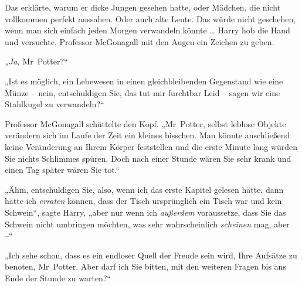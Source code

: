 Das erklärte, warum er dicke Jungen gesehen hatte, oder Mädchen, die nicht vollkommen perfekt aussahen. Oder auch alte Leute. Das würde nicht geschehen, wenn man sich einfach jeden Morgen verwandeln könnte … Harry hob die Hand und versuchte, Professor McGonagall mit den Augen ein Zeichen zu geben. 

\emph{„Ja,} Mr~Potter?“ 

„Ist es möglich, ein Lebewesen in einen gleichbleibenden Gegenstand wie eine Münze – nein, entschuldigen Sie, das tut mir furchtbar Leid – sagen wir eine Stahlkugel zu verwandeln?“ 

Professor McGonagall schüttelte den Kopf. „Mr~Potter, selbst leblose Objekte verändern sich im Laufe der Zeit ein kleines bisschen. Man könnte anschließend keine Veränderung an Ihrem Körper feststellen und die erste Minute lang würden Sie nichts Schlimmes spüren. Doch nach einer Stunde wären Sie sehr krank und einen Tag später wären Sie tot.“ 

„Ähm, entschuldigen Sie, also, wenn ich das erste Kapitel gelesen hätte, dann hätte ich \emph{erraten} können, dass der Tisch ursprünglich ein Tisch war und kein Schwein“, sagte Harry, „aber nur wenn ich \emph{außerdem} voraussetze, dass Sie das Schwein nicht umbringen möchten, was sehr wahrscheinlich \emph{scheinen} mag, aber –“

„Ich sehe schon, dass es ein endloser Quell der Freude sein wird, Ihre Aufsätze zu benoten, Mr~Potter. Aber darf ich Sie bitten, mit den weiteren Fragen bis ans Ende der Stunde zu warten?“ 

